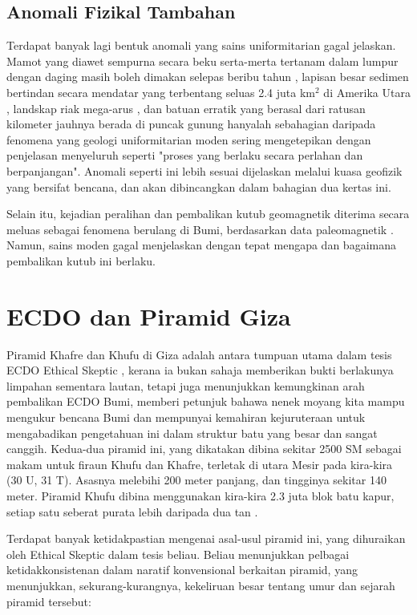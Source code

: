 \documentclass[10pt,twocolumn,letterpaper]{article}
\begin{document}
\subsection{Anomali Fizikal Tambahan}

Terdapat banyak lagi bentuk anomali yang sains uniformitarian gagal jelaskan. Mamot yang diawet sempurna secara beku serta-merta tertanam dalam lumpur dengan daging masih boleh dimakan selepas beribu tahun \cite{17,18,19}, lapisan besar sedimen bertindan secara mendatar yang terbentang seluas 2.4 juta km$^2$ di Amerika Utara \cite{21}, landskap riak mega-arus \cite{22}, dan batuan erratik yang berasal dari ratusan kilometer jauhnya berada di puncak gunung \cite{23,26} hanyalah sebahagian daripada fenomena yang geologi uniformitarian moden sering mengetepikan dengan penjelasan menyeluruh seperti "proses yang berlaku secara perlahan dan berpanjangan". Anomali seperti ini lebih sesuai dijelaskan melalui kuasa geofizik yang bersifat bencana, dan akan dibincangkan dalam bahagian dua kertas ini.

Selain itu, kejadian peralihan dan pembalikan kutub geomagnetik diterima secara meluas sebagai fenomena berulang di Bumi, berdasarkan data paleomagnetik \cite{35,40,41}. Namun, sains moden gagal menjelaskan dengan tepat mengapa dan bagaimana pembalikan kutub ini berlaku.

\section{ECDO dan Piramid Giza}

Piramid Khafre dan Khufu di Giza adalah antara tumpuan utama dalam tesis ECDO Ethical Skeptic \cite{27}, kerana ia bukan sahaja memberikan bukti berlakunya limpahan sementara lautan, tetapi juga menunjukkan kemungkinan arah pembalikan ECDO Bumi, memberi petunjuk bahawa nenek moyang kita mampu mengukur bencana Bumi dan mempunyai kemahiran kejuruteraan untuk mengabadikan pengetahuan ini dalam struktur batu yang besar dan sangat canggih. Kedua-dua piramid ini, yang dikatakan dibina sekitar 2500 SM sebagai makam untuk firaun Khufu dan Khafre, terletak di utara Mesir pada kira-kira (30 U, 31 T). Asasnya melebihi 200 meter panjang, dan tingginya sekitar 140 meter. Piramid Khufu dibina menggunakan kira-kira 2.3 juta blok batu kapur, setiap satu seberat purata lebih daripada dua tan \cite{24, 25}.

Terdapat banyak ketidakpastian mengenai asal-usul piramid ini, yang dihuraikan oleh Ethical Skeptic dalam tesis beliau. Beliau menunjukkan pelbagai ketidakkonsistenan dalam naratif konvensional berkaitan piramid, yang menunjukkan, sekurang-kurangnya, kekeliruan besar tentang umur dan sejarah piramid tersebut:
\end{document}

